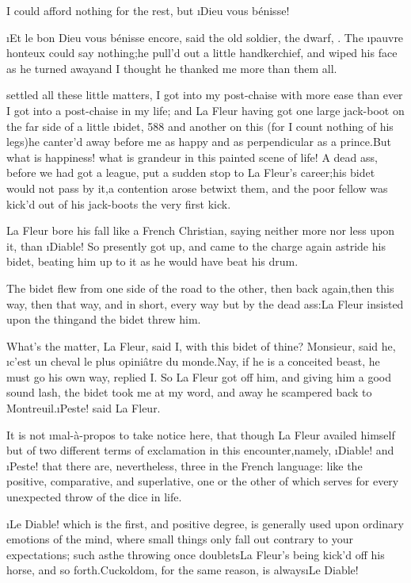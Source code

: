 \documentclass[twoside]{article}
\begin{document}
I could afford nothing for the rest, but \i{Dieu vous bénisse}!

\tsk \i{Et le bon Dieu vous bénisse encore}, said the old soldier, the dwarf,
\etc.  The \i{pauvre honteux} could say nothing;\tsk he pull’d out a little
handkerchief, and wiped his face as he turned away\tsk and I thought he
thanked me more than them all.






 settled all these little matters, I got into my post-chaise with
more ease than ever I got into a post-chaise in my life; and La Fleur
having got one large jack-boot on the far side of a little \i{bidet}, {588}
and another on this (for I count nothing of his legs)\tsk he canter’d away
before me as happy and as perpendicular as a prince.\tsk But what is
happiness! what is grandeur in this painted scene of life!  A dead ass,
before we had got a league, put a sudden stop to La Fleur’s career;\tsk his
bidet would not pass by it,\tsk a contention arose betwixt them, and the poor
fellow was kick’d out of his jack-boots the very first kick.

La Fleur bore his fall like a French Christian, saying neither more nor
less upon it, than \i{Diable}!  So presently got up, and came to the charge
again astride his bidet, beating him up to it as he would have beat his
drum.

The bidet flew from one side of the road to the other, then back
again,\tsk then this way, then that way, and in short, every way but by the
dead ass:\tsk La Fleur insisted upon the thing\tsk and the bidet threw him.

What’s the matter, La Fleur, said I, with this bidet of thine?  Monsieur,
said he, \i{c’est un cheval le plus opiniâtre du monde}.\tsk Nay, if he is a
conceited beast, he must go his own way, replied I.  So La Fleur got off
him, and giving him a good sound lash, the bidet took me at my word, and
away he scampered back to Montreuil.\tsk \i{Peste}! said La Fleur.

It is not \i{mal-à-propos} to take notice here, that though La Fleur
availed himself but of two different terms of exclamation in this
encounter,\tsk namely, \i{Diable}! and \i{Peste}! that there are, nevertheless,
three in the French language: like the positive, comparative, and
superlative, one or the other of which serves for every unexpected throw
of the dice in life.

\i{Le Diable}! which is the first, and positive degree, is generally used
upon ordinary emotions of the mind, where small things only fall out
contrary to your expectations; such as\tsk the throwing once doublets\tsk La
Fleur’s being kick’d off his horse, and so forth.\tsk Cuckoldom, for the same
reason, is always\tsk \i{Le Diable}!
\end{document}
